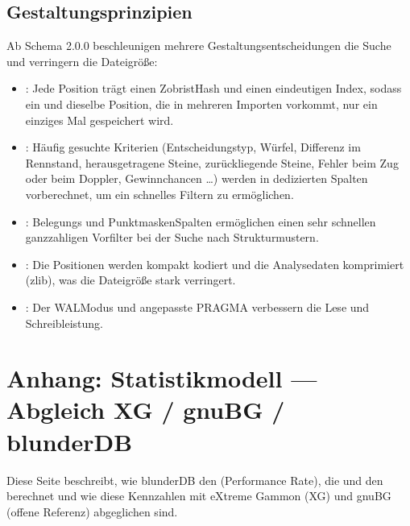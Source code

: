 \documentclass[letterpaper,10pt,german]{sphinxmanual}
\begin{document}
\subsection{Gestaltungsprinzipien}
\label{\detokenize{annexe_db_scheme:principes-de-conception}}
\sphinxAtStartPar
Ab Schema 2.0.0 beschleunigen mehrere Gestaltungsentscheidungen die Suche und verringern die Dateigröße:
\begin{itemize}
\item {} 
\sphinxAtStartPar
{}: Jede Position trägt einen Zobrist\sphinxhyphen{}Hash und einen eindeutigen Index, sodass ein und dieselbe Position, die in mehreren Importen vorkommt, nur ein einziges Mal gespeichert wird.

\item {} 
\sphinxAtStartPar
{}: Häufig gesuchte Kriterien (Entscheidungstyp, Würfel, Differenz im Rennstand, herausgetragene Steine, zurückliegende Steine, Fehler beim Zug oder beim Doppler, Gewinnchancen …) werden in dedizierten Spalten vorberechnet, um ein schnelles Filtern zu ermöglichen.

\item {} 
\sphinxAtStartPar
{}: Belegungs\sphinxhyphen{} und Punktmasken\sphinxhyphen{}Spalten ermöglichen einen sehr schnellen ganzzahligen Vorfilter bei der Suche nach Strukturmustern.

\item {} 
\sphinxAtStartPar
{}: Die Positionen werden kompakt kodiert und die Analysedaten komprimiert (zlib), was die Dateigröße stark verringert.

\item {} 
\sphinxAtStartPar
{}: Der WAL\sphinxhyphen{}Modus und angepasste PRAGMA verbessern die Lese\sphinxhyphen{} und Schreibleistung.

\end{itemize}

\sphinxstepscope


\section{Anhang: Statistikmodell — Abgleich XG / gnuBG / blunderDB}
\label{\detokenize{stats_parity:annexe-modele-de-statistiques-alignement-xg-gnubg-blunderdb}}\label{\detokenize{stats_parity:stats-parity}}\label{\detokenize{stats_parity::doc}}
\sphinxAtStartPar
Diese Seite beschreibt, wie blunderDB den  (Performance Rate), die  und den  berechnet und wie diese Kennzahlen mit eXtreme Gammon (XG) und gnuBG (offene Referenz) abgeglichen sind.
\end{document}
